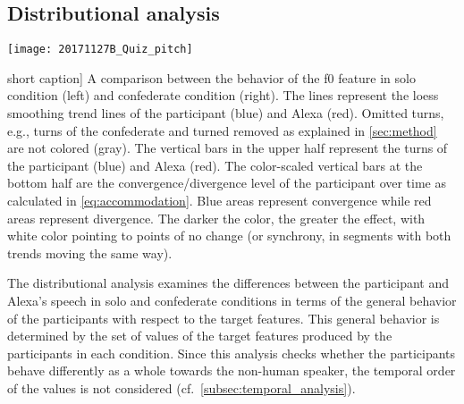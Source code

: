 \subsection{Distributional analysis}
\label{subsec:distributional_analysis}

\begin{figure*}[t]
	\centering
	\texttt{[image: 20171127B\_Quiz\_pitch]}
	\caption
		[short caption]
		{A comparison between the behavior of the \ac{f0} feature in solo condition (left) and confederate condition (right).
		The lines represent the \ac{loess} smoothing trend lines of the participant (blue) and Alexa (red).
		Omitted turns, e.g., turns of the confederate and turned removed as explained in \cref{sec:method} are not colored (gray).
		The vertical bars in the upper half represent the turns of the participant (blue) and Alexa (red).
		The color-scaled vertical bars at the bottom half are the convergence/divergence level of the participant over time as calculated in \cref{eq:accommodation}.
		Blue areas represent convergence while red areas represent divergence.
		The darker the color, the greater the effect, with white color pointing to points of no change (or synchrony, in segments with both trends moving the same way).}
	\label{fig:condition_convergence_comparison}
\end{figure*}


The distributional analysis examines the differences between the participant and Alexa's speech in solo and confederate conditions in terms of the general behavior of the participants with respect to the target features.
This general behavior is determined by the set of values of the target features produced by the participants in each condition.
Since this analysis checks whether the participants behave differently as a whole towards the non-human speaker, the temporal order of the values is not considered (cf.\ \cref{subsec:temporal_analysis}).

